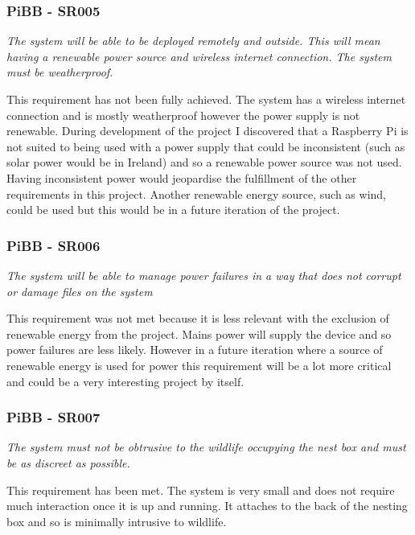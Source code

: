 \documentclass[10pt,a4paper]{article}
\begin{document}
\subsubsection{PiBB - SR005}
\begin{center}
\textit{The system will be able to be deployed remotely and outside. This will mean having a renewable power source and wireless internet connection. The system must be weatherproof.}
\linebreak
\end{center}
This requirement has not been fully achieved. The system has a wireless internet connection and is mostly weatherproof however the power supply is not renewable. During development of the project I discovered that a Raspberry Pi is not suited to being used with a power supply that could be inconsistent (such as solar power would be in Ireland) and so a renewable power source was not used. Having inconsistent power would jeopardise the fulfillment of the other requirements in this project. Another renewable energy source, such as wind, could be used but this would be in a future iteration of the project. 

\subsubsection{PiBB - SR006}
\begin{center}
\textit{The system will be able to manage power failures in a way that does not corrupt or damage files on the system}
\linebreak
\end{center}
This requirement was not met because it is less relevant with the exclusion of renewable energy from the project. Mains power will supply the device and so power failures are less likely. However in a future iteration where a source of renewable energy is used for power this requirement will be a lot more critical and could be a very interesting project by itself.

\subsubsection{PiBB - SR007}
\begin{center}
\textit{The system must not be obtrusive to the wildlife occupying the nest box and must be as discreet as possible. }
\linebreak
\end{center}
This requirement has been met. The system is very small and does not require much interaction once it is up and running. It attaches to the back of the nesting box and so is minimally intrusive to wildlife. 
\end{document}
